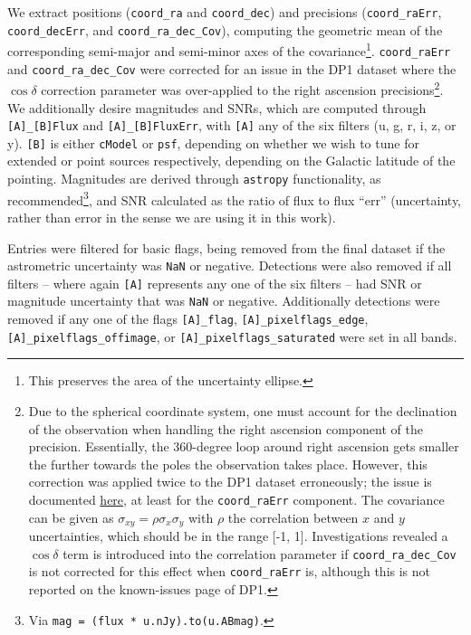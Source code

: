 \documentclass[SE,lsstdraft,authoryear,toc]{lsstdoc}
\begin{document}
We extract positions (\texttt{coord\_ra} and \texttt{coord\_dec}) and precisions (\texttt{coord\_raErr}, \texttt{coord\_decErr}, and \texttt{coord\_ra\_dec\_Cov}), computing the geometric mean of the corresponding semi-major and semi-minor axes of the covariance\footnote{This preserves the area of the uncertainty ellipse.}.
\texttt{coord\_raErr} and \texttt{coord\_ra\_dec\_Cov} were corrected for an issue in the DP1 dataset where the $\cos{\delta}$ correction parameter was over-applied to the right ascension precisions\footnote{Due to the spherical coordinate system, one must account for the declination of the observation when handling the right ascension component of the precision. Essentially, the 360-degree loop around right ascension gets smaller the further towards the poles the observation takes place. However, this correction was applied twice to the DP1 dataset erroneously; the issue is documented \href{https://dp1.lsst.io/products/known_issues_and_subtleties.html\#incorrect-geometric-scaling-in-dp1-right-ascension-errors}{here}, at least for the \texttt{coord\_raErr} component. The covariance can be given as $\sigma_{xy} = \rho \sigma_x \sigma_y$ with $\rho$ the correlation between $x$ and $y$ uncertainties, which should be in the range [-1, 1]. Investigations revealed a $\cos{\delta}$ term is introduced into the correlation parameter if \texttt{coord\_ra\_dec\_Cov} is not corrected for this effect when \texttt{coord\_raErr} is, although this is not reported on the known-issues page of DP1.}.
We additionally desire magnitudes and SNRs, which are computed through \texttt{[A]\_[B]Flux} and \texttt{[A]\_[B]FluxErr}, with \texttt{[A]} any of the six filters (u, g, r, i, z, or y).
\texttt{[B]} is either \texttt{cModel} or \texttt{psf}, depending on whether we wish to tune for extended or point sources respectively, depending on the Galactic latitude of the pointing.
Magnitudes are derived through \texttt{astropy} functionality, as recommended\footnote{Via \texttt{mag = (flux * u.nJy).to(u.ABmag)}.}, and SNR calculated as the ratio of flux to flux ``err'' (uncertainty, rather than error in the sense we are using it in this work).

Entries were filtered for basic flags, being removed from the final dataset if the astrometric uncertainty was \texttt{NaN} or negative.
Detections were also removed if all filters -- where again \texttt{[A]} represents any one of the six filters -- had SNR or magnitude uncertainty that was \texttt{NaN} or negative.
Additionally detections were removed if any one of the flags \texttt{[A]\_flag}, \texttt{[A]\_pixelflags\_edge}, \texttt{[A]\_pixelflags\_offimage}, or \texttt{[A]\_pixelflags\_saturated} were set in all bands.
\end{document}
